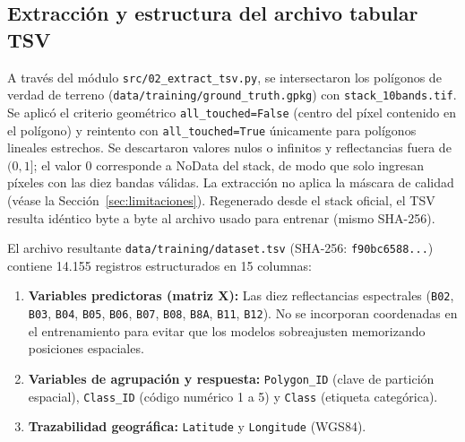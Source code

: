 \documentclass[11pt,a4paper]{article}
\begin{document}
\subsection{Extracción y estructura del archivo tabular TSV}
A través del módulo \texttt{src/02\_extract\_tsv.py}, se intersectaron los polígonos de verdad de terreno (\texttt{data/training/ground\_truth.gpkg}) con \texttt{stack\_10bands.tif}. Se aplicó el criterio geométrico \texttt{all\_touched=False} (centro del píxel contenido en el polígono) y reintento con \texttt{all\_touched=True} únicamente para polígonos lineales estrechos. Se descartaron valores nulos o infinitos y reflectancias fuera de $(0, 1]$; el valor 0 corresponde a NoData del stack, de modo que solo ingresan píxeles con las diez bandas válidas. La extracción no aplica la máscara de calidad (véase la Sección~\ref{sec:limitaciones}). Regenerado desde el stack oficial, el TSV resulta idéntico byte a byte al archivo usado para entrenar (mismo SHA-256).

El archivo resultante \texttt{data/training/dataset.tsv} (SHA-256: \texttt{f90bc6588...}) contiene 14.155 registros estructurados en 15 columnas:
\begin{enumerate}[noitemsep,topsep=2pt]
    \item \textbf{Variables predictoras (matriz $\boldsymbol{X}$):} Las diez reflectancias espectrales (\texttt{B02}, \texttt{B03}, \texttt{B04}, \texttt{B05}, \texttt{B06}, \texttt{B07}, \texttt{B08}, \texttt{B8A}, \texttt{B11}, \texttt{B12}). No se incorporan coordenadas en el entrenamiento para evitar que los modelos sobreajusten memorizando posiciones espaciales.
    \item \textbf{Variables de agrupación y respuesta:} \texttt{Polygon\_ID} (clave de partición espacial), \texttt{Class\_ID} (código numérico 1 a 5) y \texttt{Class} (etiqueta categórica).
    \item \textbf{Trazabilidad geográfica:} \texttt{Latitude} y \texttt{Longitude} (WGS84).
\end{enumerate}
\end{document}
